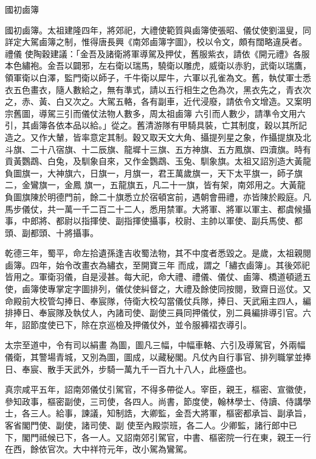 
\begin{pinyinscope}

 國初鹵簿



 國初鹵簿。太祖建隆四年，將郊祀，大禮使範質與鹵簿使張昭、儀仗使劉溫叟，同詳定大駕鹵簿之制，惟得唐長興《南郊鹵簿字圖》，校以令文，頗有闊略違戾者。禮儀
 使陶穀建議：「金吾及諸衛將軍導駕及押仗，舊服紫衣，請依《開元禮》各服本色繡袍。金吾以闢邪，左右衛以瑞馬，驍衛以雕虎，威衛以赤豹，武衛以瑞鷹，領軍衛以白澤，監門衛以師子，千牛衛以犀牛，六軍以孔雀為文。舊，執仗軍士悉衣五色畫衣，隨人數給之，無有準式，請以五行相生之色為次，黑衣先之，青衣次之，赤、黃、白又次之。大駕五輅，各有副車，近代浸廢，請依令文增造。又案明宗舊圖，導駕三引而儀仗法物人數多，周太祖鹵簿
 六引而人數少，請準令文用六引，其鹵簿各依本品以給。」從之。舊清游隊有甲騎具裝，亡其制度，穀以其所記造之。又作大輦，皆率意定其制。穀又取天文大角、攝提列星之象，作攝提旗及北斗旗、二十八宿旗、十二辰旗、龍墀十三旗、五方神旗、五方鳳旗、四瀆旗。時有貢黃鸚鵡、白兔，及馴象自來，又作金鸚鵡、玉兔、馴象旗。太祖又詔別造大黃龍負圖旗一，大神旗六，日旗一，月旗一，君王萬歲旗一，天下太平旗一，師子旗二，金鸞旗一，金鳳
 旗一，五龍旗五，凡二十一旗，皆有架，南郊用之。大黃龍負圖旗陳於明德門前，餘二十旗悉立於宿頓宮前，遇朝會冊禮，亦皆陳於殿庭。凡馬步儀仗，共一萬一千二百二十二人，悉用禁軍。大將軍、將軍以軍主、都虞候攝事，中郎將、都尉以指揮使、副指揮使攝事，校尉、主帥以軍使、副兵馬使、都頭、副都頭、十將攝事。



 乾德三年，蜀平，命左拾遺孫逢吉收蜀法物，其不中度者悉毀之。是歲，太祖親閱鹵簿。四年，始令改畫衣為繡衣，至開寶三年
 而成，謂之「繡衣鹵簿」。其後郊祀皆用之。軍衛羽儀，自是浸甚。每大祀，命大禮、禮儀、儀仗、鹵簿、橋道頓遞五使，鹵簿使專掌定字圖排列，儀仗使糾督之，大禮及餘使同按閱，致齋日巡仗。又命殿前大校管勾捧日、奉宸隊，侍衛大校勾當儀仗兵隊，捧日、天武廂主四人，編排捧日、奉宸隊及執仗人，內諸司使、副使三員同押儀仗，別二員編排導引官。六年，詔節度使已下，除在京巡檢及押儀仗外，並令服褲褶衣導引。



 太宗至道中，令有司以絹畫
 為圖，圖凡三幅，中幅車輅、六引及導駕官，外兩幅儀衛，其警場青城，又別為圖，圖成，以藏秘閣。凡仗內自行事官、排列職掌並捧日、奉宸、散手天武外，步騎一萬九千一百九十八人，此極盛也。



 真宗咸平五年，詔南郊儀仗引駕官，不得多帶從人。宰臣，親王，樞密、宣徽使，參知政事，樞密副使，三司使，各四人。尚書，節度使，翰林學士、侍讀、侍講學士，各三人。給事，諫議，知制誥，大卿監，金吾大將軍，樞密都承旨、副承旨，客省閣門使、副使，諸司使、副
 使至內殿崇班，各二人。少卿監，諸行郎中已下，閣門祗候已下，各一人。又詔南郊引駕官，中書、樞密院一行在東，親王一行在西，餘依官次。大中祥符元年，改小駕為鸞駕。




\end{pinyinscope}
